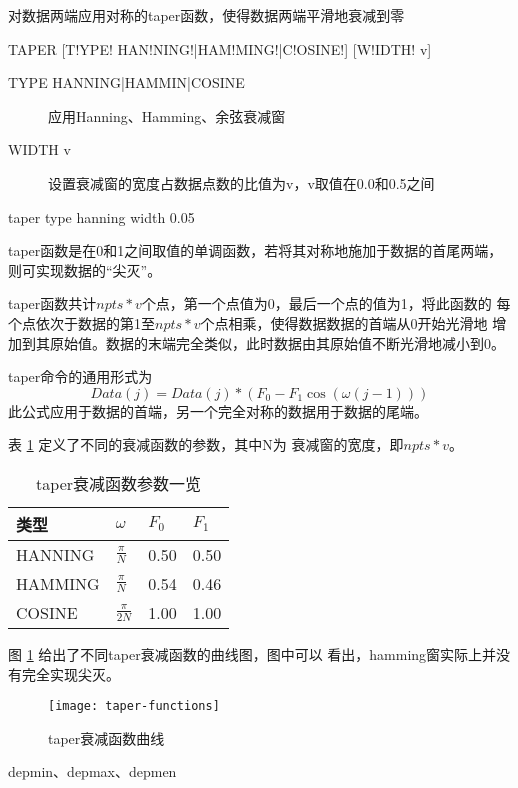 \label{cmd:taper}

对数据两端应用对称的taper函数，使得数据两端平滑地衰减到零

\begin{SACSTX}
TAPER [T!YPE! HAN!NING!|HAM!MING!|C!OSINE!] [W!IDTH! v]
\end{SACSTX}

\begin{description}
\item [TYPE HANNING|HAMMIN|COSINE] 应用Hanning、Hamming、余弦衰减窗
\item [WIDTH v] 设置衰减窗的宽度占数据点数的比值为v，v取值在0.0和0.5之间
\end{description}

\begin{SACDFT}
taper type hanning width 0.05
\end{SACDFT}

taper函数是在0和1之间取值的单调函数，若将其对称地施加于数据的首尾两端，
则可实现数据的``尖灭''。

taper函数共计$npts*v$个点，第一个点值为0，最后一个点的值为1，将此函数的
每个点依次于数据的第1至$npts*v$个点相乘，使得数据数据的首端从0开始光滑地
增加到其原始值。数据的末端完全类似，此时数据由其原始值不断光滑地减小到0。

taper命令的通用形式为
\[
    Data(j) = Data(j)*(F_0 - F_1\cos(\omega(j-1)))
\]
此公式应用于数据的首端，另一个完全对称的数据用于数据的尾端。

表 \ref{table:taper-functions} 定义了不同的衰减函数的参数，其中N为
衰减窗的宽度，即$npts*v$。
\begin{table}[ht]
\centering
\caption{taper衰减函数参数一览}
\label{table:taper-functions}
\begin{tabular}{llll}
\toprule
类型 & $\omega$ & $F_0$ & $F_1$ \\
\midrule
HANNING &   $\frac{\pi}{N}$     &   0.50    &   0.50    \\
HAMMING &   $\frac{\pi}{N}$     &   0.54    &   0.46    \\
COSINE  &   $\frac{\pi}{2N}$    &   1.00    &   1.00    \\
\bottomrule
\end{tabular}
\end{table}

图 \ref{fig:taper-functions} 给出了不同taper衰减函数的曲线图，图中可以
看出，hamming窗实际上并没有完全实现尖灭。
\begin{figure}[!ht]
\centering
\texttt{[image: taper-functions]}
\caption{taper衰减函数曲线}
\label{fig:taper-functions}
\end{figure}

depmin、depmax、depmen
